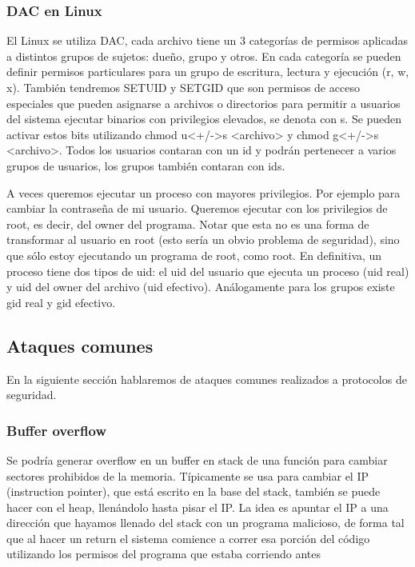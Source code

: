\documentclass{article}
\begin{document}
\subsubsection{DAC en Linux}

El Linux se utiliza DAC, cada archivo tiene un 3 categorías de permisos aplicadas a distintos grupos de sujetos: dueño, grupo y otros. En cada categoría se pueden definir permisos particulares para un grupo de escritura, lectura y ejecución (r, w, x). También tendremos SETUID y SETGID que son permisos de acceso especiales que pueden asignarse a archivos o directorios para permitir a usuarios del sistema ejecutar binarios con privilegios elevados, se denota con s. Se pueden activar estos bits utilizando chmod u<+/->s <archivo> y chmod g<+/->s <archivo>. Todos los usuarios contaran con un id y podrán pertenecer a varios grupos de usuarios, los grupos también contaran con ids.

A veces queremos ejecutar un proceso con mayores privilegios. Por ejemplo para cambiar la contraseña de mi usuario. Queremos ejecutar con los privilegios de root, es decir, del owner del programa. Notar que esta no es una forma de transformar al usuario en root (esto sería un obvio problema de seguridad), sino que sólo estoy ejecutando un programa de root, como root. En definitiva, un proceso tiene dos tipos de uid: el uid del usuario que ejecuta un proceso (uid real) y uid del owner del archivo (uid efectivo). Análogamente para los grupos existe gid real y gid efectivo.

\subsection{Ataques comunes}


En la siguiente sección hablaremos de ataques comunes realizados a protocolos de seguridad.

\subsubsection{Buffer overflow}


Se podría generar overflow en un buffer en stack de una función para cambiar sectores prohibidos de la memoria. Típicamente se usa para cambiar el IP (instruction pointer), que está escrito en la base del stack, también se puede hacer con el heap, llenándolo hasta pisar el IP. La idea es apuntar el IP a una dirección que hayamos llenado del stack con un programa malicioso, de forma tal que al hacer un return el sistema comience a correr esa porción del código utilizando los permisos del programa que estaba corriendo antes
\end{document}
